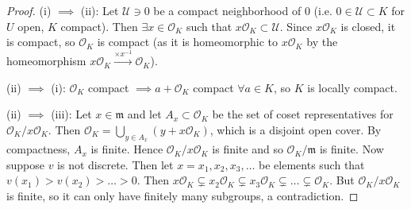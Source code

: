 \documentclass{article}
\theoremstyle{definition}
\begin{document}
\begin{proof}
    (i) $\implies $ (ii): Let $\mathcal{U} \ni 0$ be a compact neighborhood of 0 (i.e. $0 \in \mathcal{U} \subset K$ for $U$ open, $K$ compact). Then $\exists x \in \mathcal{O}_K$ such that $x \mathcal{O}_K \subset \mathcal{U}$. Since $x \mathcal{O}_K$ is closed, it is compact, so $\mathcal{O}_K$ is compact (as it is homeomorphic to $x \mathcal{O}_K$ by the homeomorphism $x \mathcal{O}_K \stackrel{\times x^{-1}}{\to} \mathcal{O}_K$).
    \vspace{1mm}
     
    (ii) $\implies$ (i): $\mathcal{O}_K$ compact $\implies a + \mathcal{O}_K$ compact $\forall a \in K$, so $K$ is locally compact.
    \vspace{1mm}
     
    (ii) $\implies $ (iii): Let $x \in \mathfrak{m}$ and let $A_x \subset \mathcal{O}_K$ be the set of coset representatives for $\mathcal{O}_K/x \mathcal{O}_K$. Then $\mathcal{O}_K = \bigcup_{y \in A_x} (y+ x\mathcal{O}_K)$, which is a disjoint open cover. By compactness, $A_x$ is finite. Hence $\mathcal{O}_K/x \mathcal{O}_K$ is finite and so $\mathcal{O}_K/\mathfrak{m}$ is finite. Now suppose $v$ is not discrete. Then let $x=x_1,x_2,x_3,\ldots$ be elements such that $v(x_1) > v(x_2) > \ldots > 0$. Then $x \mathcal{O}_K \subsetneq x_2 \mathcal{O}_K \subsetneq x_3 \mathcal{O}_K \subsetneq \ldots \subsetneq\mathcal{O}_K$. But $\mathcal{O}_K/x \mathcal{O}_K$ is finite, so it can only have finitely many subgroups, a contradiction.
    \vspace{1mm}
     

\end{proof}
\end{document}
